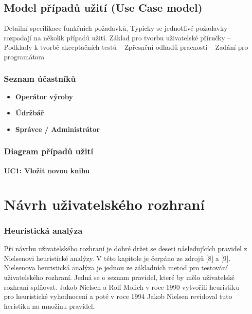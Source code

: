 \documentclass[thesis=M,czech]{FITthesis}[2012/06/26]
\begin{document}
\section{Model případů užití (Use Case model)}
Detailní specifikace funkčních požadavků, Typicky se jednotlivé požadavky rozpadají na několik případů užití. Základ pro tvorbu uživatelské příručky
– Podklady k tvorbě akceptačních testů
– Zpřesnění odhadů pracnosti
– Zadání pro programátora


\subsection{Seznam účastníků}

\begin{itemize}
	\item
	\textbf{Operátor výroby} 
	\item
	\textbf{Údržbář} 
	\item
	\textbf{Správce / Administrátor}
\end{itemize} 	

\subsection{Diagram případů užití}

\subsubsection{UC1: Vložit novou knihu}

\chapter{Návrh uživatelského rozhraní}

\subsection{}

\subsection{Heuristická analýza}
Při návrhu uživatelského rozhraní je dobré držet se deseti následujících pravidel z Nielsenovi heuristické analýzy. V této kapitole je čerpáno ze zdrojů [8] a [9]. Nielsenova heuristická analýza je jednou ze základních metod pro testování uživatelského rozhraní. Jedná se o seznam pravidel, které by mělo uživatelské rozhraní splňovat. Jakob Nielsen a Rolf Molich v roce 1990 vytvořili heuristiku
pro heuristické vyhodnocení a poté v roce 1994 Jakob Nielsen revidoval tuto heristiku na množinu pravidel.
\end{document}

